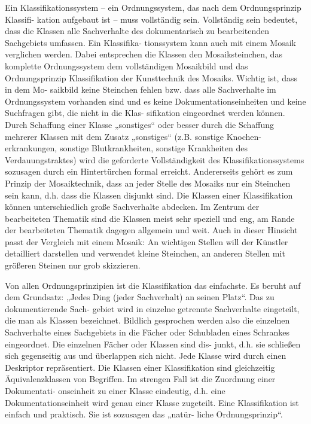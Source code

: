 \begin{centernss}
{\begin{minipage}[t]{.8\linewidth}
Ein Klassifikationssystem -- ein Ordnungssystem, das nach dem Ordnungsprinzip Klassifi-
kation aufgebaut ist -- muss vollständig sein. Vollständig sein bedeutet, dass die Klassen alle
Sachverhalte des dokumentarisch zu bearbeitenden Sachgebiets umfassen. Ein Klassifika-
tionssystem kann auch mit einem Mosaik verglichen werden. Dabei entsprechen die Klassen
den Mosaiksteinchen, das komplette Ordnungssystem dem vollständigen Mosaikbild und das
Ordnungsprinzip Klassifikation der Kunsttechnik des Mosaiks. Wichtig ist, dass in dem Mo-
saikbild keine Steinchen fehlen bzw. dass alle Sachverhalte im Ordnungssystem vorhanden
sind und es keine Dokumentationseinheiten und keine Suchfragen gibt, die nicht in die Klas-
sifikation eingeordnet werden können. Durch Schaffung einer Klasse „sonstiges“ oder besser
durch die Schaffung mehrerer Klassen mit dem Zusatz „sonstiges“ (z.B. sonstige Knochen-
erkrankungen, sonstige Blutkrankheiten, sonstige Krankheiten des Verdauungstraktes) wird
die geforderte Vollständigkeit des Klassifikationssystems sozusagen durch ein Hintertürchen
formal erreicht. Andererseits gehört es zum Prinzip der Mosaiktechnik, dass an jeder Stelle
des Mosaiks nur ein Steinchen sein kann, d.h. dass die Klassen disjunkt sind.
Die Klassen einer Klassifikation können unterschiedlich große Sachverhalte abdecken. Im
Zentrum der bearbeiteten Thematik sind die Klassen meist sehr speziell und eng, am Rande
der bearbeiteten Thematik dagegen allgemein und weit. Auch in dieser Hinsicht passt der
Vergleich mit einem Mosaik: An wichtigen Stellen will der Künstler detailliert darstellen
und verwendet kleine Steinchen, an anderen Stellen mit größeren Steinen nur grob
skizzieren.
\end{minipage}
}
\normalcolor
\end{centernss}

\begin{customIndentRight}
Von allen Ordnungsprinzipien ist die Klassifikation das einfachste. Es beruht auf dem
Grundsatz: „Jedes Ding (jeder Sachverhalt) an seinen Platz“. Das zu dokumentierende Sach-
gebiet wird in einzelne getrennte Sachverhalte eingeteilt, die man als Klassen bezeichnet.
Bildlich gesprochen werden also die einzelnen Sachverhalte eines Sachgebiets in die Fächer
oder Schubladen eines Schrankes eingeordnet. Die einzelnen Fächer oder Klassen sind dis-
junkt, d.h. sie schließen sich gegenseitig aus und überlappen sich nicht. Jede Klasse wird
durch einen Deskriptor repräsentiert. Die Klassen einer Klassifikation sind gleichzeitig
Äquivalenzklassen von Begriffen. Im strengen Fall ist die Zuordnung einer Dokumentati-
onseinheit zu einer Klasse eindeutig, d.h. eine Dokumentationseinheit wird genau einer
Klasse zugeteilt. Eine Klassifikation ist einfach und praktisch. Sie ist sozusagen das „natür-
liche Ordnungsprinzip“.
\end{customIndentRight}

